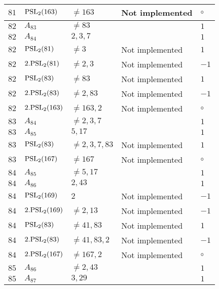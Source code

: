 \documentclass[a4paper, 11pt]{article}
\begin{document}
\begin{longtable}{lllll}
        $ 81 $ & $ {\rm PSL}_{2}(163) $ & $ \neq 163 $ & Not implemented & $\circ$ \\ \hline
        $ 82 $ & $ A_{83} $ & $ \neq 83 $ & $ ~ $ & $ 1  $ \\ \hline
        $ 82 $ & $ A_{84} $ & $ 2, 3, 7 $ & $ ~ $ & $ 1  $ \\ \hline
        $ 82 $ & $ {\rm PSL}_{2}(81) $ & $ \neq 3 $ & Not implemented & $ 1  $ \\ \hline
        $ 82 $ & $ 2.{\rm PSL}_{2}(81) $ & $ \neq 2, 3 $ & Not implemented & $ -1  $ \\ \hline
        $ 82 $ & $ {\rm PSL}_{2}(83) $ & $ \neq 83 $ & Not implemented & $ 1  $ \\ \hline
        $ 82 $ & $ 2.{\rm PSL}_{2}(83) $ & $ \neq 2, 83 $ & Not implemented & $ -1  $ \\ \hline
        $ 82 $ & $ 2.{\rm PSL}_{2}(163) $ & $ \neq 163, 2 $ & Not implemented & $\circ$ \\ \hline
        $ 83 $ & $ A_{84} $ & $ \neq 2, 3, 7 $ & $ ~ $ & $ 1  $ \\ \hline
        $ 83 $ & $ A_{85} $ & $ 5, 17 $ & $ ~ $ & $ 1  $ \\ \hline
        $ 83 $ & $ {\rm PSL}_{2}(83) $ & $ \neq 2, 3, 7, 83 $ & Not implemented & $ 1  $ \\ \hline
        $ 83 $ & $ {\rm PSL}_{2}(167) $ & $ \neq 167 $ & Not implemented & $\circ$ \\ \hline
        $ 84 $ & $ A_{85} $ & $ \neq 5, 17 $ & $ ~ $ & $ 1  $ \\ \hline
        $ 84 $ & $ A_{86} $ & $ 2, 43 $ & $ ~ $ & $ 1  $ \\ \hline
        $ 84 $ & $ {\rm PSL}_{2}(169) $ & $ 2 $ & Not implemented & $ -1  $ \\ \hline
        $ 84 $ & $ 2.{\rm PSL}_{2}(169) $ & $ \neq 2, 13 $ & Not implemented & $ -1  $ \\ \hline
        $ 84 $ & $ {\rm PSL}_{2}(83) $ & $ \neq 41, 83 $ & Not implemented & $ 1  $ \\ \hline
        $ 84 $ & $ 2.{\rm PSL}_{2}(83) $ & $ \neq 41, 83, 2 $ & Not implemented & $ -1  $ \\ \hline
        $ 84 $ & $ 2.{\rm PSL}_{2}(167) $ & $ \neq 167, 2 $ & Not implemented & $\circ$ \\ \hline
        $ 85 $ & $ A_{86} $ & $ \neq 2, 43 $ & $ ~ $ & $ 1  $ \\ \hline
        $ 85 $ & $ A_{87} $ & $ 3, 29 $ & $ ~ $ & $ 1  $ \\ \hline

\end{longtable}
\end{document}
